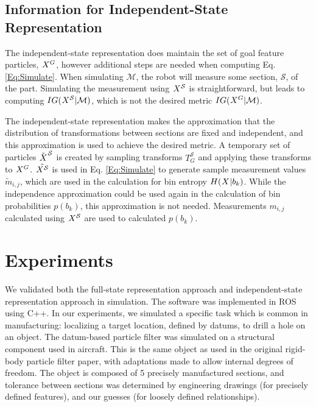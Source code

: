 \documentclass[letterpaper, 10 pt, conference]{ieeeconf}
\newcommand{\maction}{\mathcal{M}}
\newcommand{\bin}{b}
\newcommand{\measurement}{m}
\newcommand{\feature}{\mathcal{S}}
\begin{document}
\subsection{Information for Independent-State Representation}
The independent-state representation does maintain the set of goal feature particles, $\particles[][][G]$, however additional steps are needed when computing Eq. \ref{Eq:Simulate}.
When simulating $\maction$, the robot will measure some section, $\feature$, of the part.
Simulating the measurement using $\particles[][][\feature]$ is straightforward, but leads to computing $IG(\particles[][][\feature]|\maction)$, which is not the desired metric $IG(\particles[][][G]|\maction)$.


The independent-state representation makes the approximation that the distribution of transformations between sections are fixed and independent, and this approximation is used to achieve the desired metric.  
A temporary set of particles $\tilde \particles^\feature$ is created by sampling transforms $T_G^\feature$ and applying these transforms to $\particles[][][G]$.
$\tilde {\particles[][][\feature]}$ is used in Eq. \ref{Eq:Simulate} to generate sample measurement values $\tilde \measurement_{i,j}$, which are used in the calculation for bin entropy $H(\particles|\bin_k)$.
While the independence approximation could be used again in the calculation of bin probabilities $p(\bin_k)$, this approximation is not needed. 
Measurements $m_{i,j}$ calculated using $\particles[][][\feature]$ are used to calculated $p(\bin_k)$.



\section{Experiments} \label{sec:experiment}

We validated both the full-state representation approach and independent-state representation approach in simulation. 
The software was implemented in ROS using C++. 
In our experiments, we simulated a specific task which is common in manufacturing: localizing a target location, defined by datums, to drill a hole on an object. 
The datum-based particle filter was simulated on a structural component used in aircraft. This is the same object as used in the original rigid-body particle filter paper\cite{Saund2017}, with adaptations made to allow internal degrees of freedom.
The object is composed of 5 precisely manufactured sections, and tolerance between sections was determined by engineering drawings (for precisely defined features), and our guesses (for loosely defined relationships). 
\end{document}
